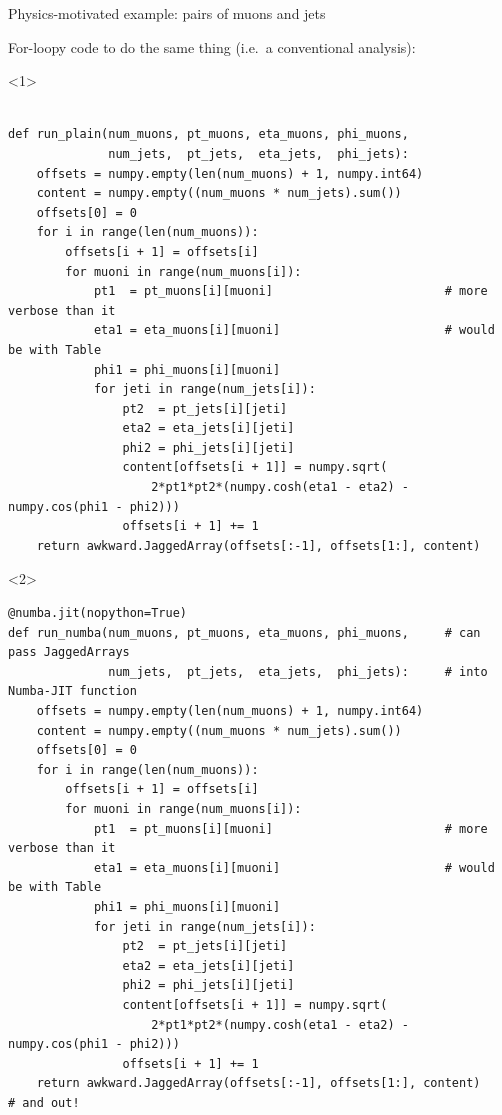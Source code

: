 \documentclass[aspectratio=169]{beamer}
\begin{document}
\begin{frame}[fragile]{Physics-motivated example: pairs of muons and jets}
\vspace{0.25 cm}

{For-loopy code to do the same thing (i.e.\ a conventional analysis):}

\scriptsize
\begin{onlyenv}<1>
\begin{verbatim}

def run_plain(num_muons, pt_muons, eta_muons, phi_muons,
              num_jets,  pt_jets,  eta_jets,  phi_jets):
    offsets = numpy.empty(len(num_muons) + 1, numpy.int64)
    content = numpy.empty((num_muons * num_jets).sum())
    offsets[0] = 0
    for i in range(len(num_muons)):
        offsets[i + 1] = offsets[i]
        for muoni in range(num_muons[i]):
            pt1  = pt_muons[i][muoni]                        # more verbose than it
            eta1 = eta_muons[i][muoni]                       # would be with Table
            phi1 = phi_muons[i][muoni]
            for jeti in range(num_jets[i]):
                pt2  = pt_jets[i][jeti]
                eta2 = eta_jets[i][jeti]
                phi2 = phi_jets[i][jeti]
                content[offsets[i + 1]] = numpy.sqrt(
                    2*pt1*pt2*(numpy.cosh(eta1 - eta2) - numpy.cos(phi1 - phi2)))
                offsets[i + 1] += 1
    return awkward.JaggedArray(offsets[:-1], offsets[1:], content)
\end{verbatim}
\end{onlyenv}
\begin{onlyenv}<2>
\begin{verbatim}
@numba.jit(nopython=True)
def run_numba(num_muons, pt_muons, eta_muons, phi_muons,     # can pass JaggedArrays
              num_jets,  pt_jets,  eta_jets,  phi_jets):     # into Numba-JIT function
    offsets = numpy.empty(len(num_muons) + 1, numpy.int64)
    content = numpy.empty((num_muons * num_jets).sum())
    offsets[0] = 0
    for i in range(len(num_muons)):
        offsets[i + 1] = offsets[i]
        for muoni in range(num_muons[i]):
            pt1  = pt_muons[i][muoni]                        # more verbose than it
            eta1 = eta_muons[i][muoni]                       # would be with Table
            phi1 = phi_muons[i][muoni]
            for jeti in range(num_jets[i]):
                pt2  = pt_jets[i][jeti]
                eta2 = eta_jets[i][jeti]
                phi2 = phi_jets[i][jeti]
                content[offsets[i + 1]] = numpy.sqrt(
                    2*pt1*pt2*(numpy.cosh(eta1 - eta2) - numpy.cos(phi1 - phi2)))
                offsets[i + 1] += 1
    return awkward.JaggedArray(offsets[:-1], offsets[1:], content)          # and out!
\end{verbatim}
\end{onlyenv}
\end{frame}
\end{document}
